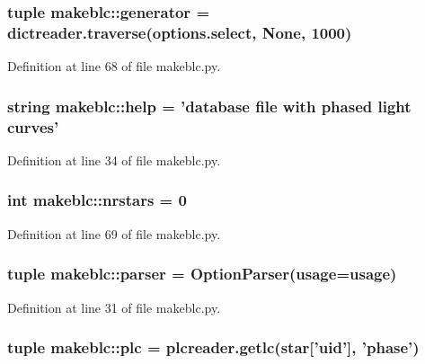 \hypertarget{namespacemakeblc_a0eac396194b25b741b019161364a481e}{
\subsubsection[{generator}]{\setlength{\rightskip}{0pt plus 5cm}tuple {\bf makeblc::generator} = dictreader.traverse(options.select, None, 1000)}}
\label{namespacemakeblc_a0eac396194b25b741b019161364a481e}


Definition at line 68 of file makeblc.py.

\hypertarget{namespacemakeblc_a6dea7c4e16e828d56e7094476327ae97}{
\subsubsection[{help}]{\setlength{\rightskip}{0pt plus 5cm}string {\bf makeblc::help} = 'database file with phased light curves'}}
\label{namespacemakeblc_a6dea7c4e16e828d56e7094476327ae97}


Definition at line 34 of file makeblc.py.

\hypertarget{namespacemakeblc_abd854e539cc9c9fe5d64b72438f277f2}{
\subsubsection[{nrstars}]{\setlength{\rightskip}{0pt plus 5cm}int {\bf makeblc::nrstars} = 0}}
\label{namespacemakeblc_abd854e539cc9c9fe5d64b72438f277f2}


Definition at line 69 of file makeblc.py.

\hypertarget{namespacemakeblc_a0dea09705bbc782eda44fd29626ff35b}{
\subsubsection[{parser}]{\setlength{\rightskip}{0pt plus 5cm}tuple {\bf makeblc::parser} = OptionParser({\bf usage}={\bf usage})}}
\label{namespacemakeblc_a0dea09705bbc782eda44fd29626ff35b}


Definition at line 31 of file makeblc.py.

\hypertarget{namespacemakeblc_af310689cda88b823a447e448e95ee55d}{
\subsubsection[{plc}]{\setlength{\rightskip}{0pt plus 5cm}tuple {\bf makeblc::plc} = plcreader.getlc(star\mbox{[}'uid'\mbox{]}, 'phase')}}
\label{namespacemakeblc_af310689cda88b823a447e448e95ee55d}


